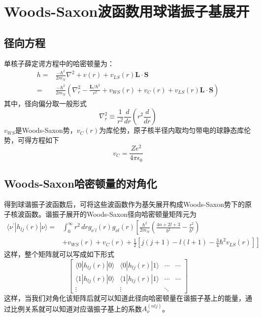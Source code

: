 \section{Woods-Saxon波函数用球谐振子基展开}
\subsection{径向方程}
单核子薛定谔方程中的哈密顿量为：
\begin{equation}
	\begin{aligned}
		h =& \frac{-\hbar^2}{2 m_{N}} \nabla^2 + v(r) + v_{LS}(r) \boldsymbol{L\cdot S}	\\
		=& \frac{-\hbar^2}{2 m_{N}}\left(\nabla^2_{r} - \frac{\boldsymbol{L}/\hbar^2}{r^2} + v_{WS}(r) + v_{C}(r) + v_{LS}(r)\boldsymbol{L\cdot S}\right)
	\end{aligned}
\end{equation} 
其中，径向偏分取一般形式
\begin{equation}
	\nabla^2_{r} \equiv \frac{1}{r^2} \frac{d}{dr} \left(r^2 \frac{d}{dr}\right)
\end{equation}
$v_{WS}$是Woods-Saxon势，$v_{C}(r)$为库伦势，原子核半径内取均匀带电的球静态库伦势，可得方程如下
\begin{equation}
	v_{C} = \frac{Ze^2}{4\pi\epsilon_0}
\end{equation} 

\subsection{Woods-Saxon哈密顿量的对角化}
得到球谐振子波函数后，可将这些波函数作为基矢展开构成Woods-Saxon势下的原子核波函数。谐振子展开的Woods-Saxon径向哈密顿量矩阵元为
\begin{equation}
    \begin{aligned}
		\langle \nu^{\prime} | h_{lj}(r) | \nu\rangle =&\int_{0}^{\infty} r^2 \,dr g_{\nu^{\prime} l}(r) g_{\nu l}(r) \left[ \frac{\hbar^2}{2m_N} \left(\frac{4n + 2l + 3}{b^2} - \frac{r^2}{b^4}\right) \right. \\
		&+ \left. v_{WS}(r) + v_{C}(r) + \frac{1}{2}\left[j(j+1) - l(l+1) - \frac{3}{4}\hbar^2 v_{LS}(r)\right] \right]
    \end{aligned}
\end{equation}
这样，整个矩阵就可以写成如下形式
\begin{equation}
	\begin{bmatrix}
		\langle 0 | h_{lj}(r) | 0 \rangle & \langle 0 | h_{lj}(r) | 1 \rangle & \cdots	& \cdots	\\
		\langle 1 | h_{lj}(r) | 0 \rangle & \langle 1 | h_{lj}(r) | 1 \rangle & \cdots	& \cdots	\\
		\vdots	&	\vdots	& \ddots
	\end{bmatrix}
\end{equation}
这样，当我们对角化该矩阵后就可以知道此径向哈密顿量在谐振子基上的能量，通过比例关系就可以知道对应谐振子基上的系数$A_{\nu}^{(nlj)}$。


